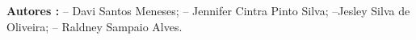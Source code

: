 \documentclass{article}
\begin{document}
\Huge{\bf Autores :}
\newline
\newline
-- Davi Santos Meneses;
\newline
\newline
-- Jennifer Cintra Pinto Silva;
\newline
\newline
--Jesley Silva de Oliveira;
\newline
\newline
-- Raldney Sampaio Alves.
\end{document}
